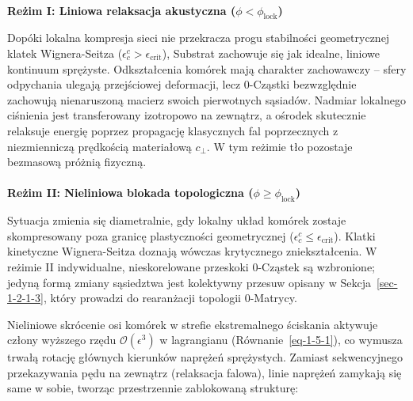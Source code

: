 \documentclass[
  polish,
  letterpaper,
  DIV=11,
  numbers=noendperiod,
  oneside]{scrartcl}
\makeatletter
\let\oldparagraph\paragraph
\renewcommand{\paragraph}{
    \@ifstar
      \xxxParagraphStar
      \xxxParagraphNoStar
  }
\newcommand{\xxxParagraphStar}[1]{\oldparagraph*{#1}\mbox{}}
\newcommand{\xxxParagraphNoStar}[1]{\oldparagraph{#1}\mbox{}}
\makeatother
\begin{document}
\paragraph{\texorpdfstring{\textbf{Reżim I: Liniowa relaksacja
akustyczna
(\(\phi < \phi_{\text{lock}}\))}}{Reżim I: Liniowa relaksacja akustyczna (\textbackslash phi \textless{} \textbackslash phi\_\{\textbackslash text\{lock\}\})}}\label{sec-1-5-2-1}

Dopóki lokalna kompresja sieci nie przekracza progu stabilności
geometrycznej klatek Wignera-Seitza
(\(\epsilon^c_c > \epsilon_{\text{crit}}\)), Substrat zachowuje się jak
idealne, liniowe kontinuum sprężyste. Odkształcenia komórek mają
charakter zachowawczy -- sfery odpychania ulegają przejściowej
deformacji, lecz 0-Cząstki bezwzględnie zachowują nienaruszoną macierz
swoich pierwotnych sąsiadów. Nadmiar lokalnego ciśnienia jest
transferowany izotropowo na zewnątrz, a ośrodek skutecznie relaksuje
energię poprzez propagację klasycznych fal poprzecznych z niezmienniczą
prędkością materiałową \(c_{\perp}\). W tym reżimie tło pozostaje
bezmasową próżnią fizyczną.

\paragraph{\texorpdfstring{\textbf{Reżim II: Nieliniowa blokada
topologiczna
(\(\phi \ge \phi_{\text{lock}}\))}}{Reżim II: Nieliniowa blokada topologiczna (\textbackslash phi \textbackslash ge \textbackslash phi\_\{\textbackslash text\{lock\}\})}}\label{sec-1-5-2-2}

Sytuacja zmienia się diametralnie, gdy lokalny układ komórek zostaje
skompresowany poza granicę plastyczności geometrycznej
(\(\epsilon^c_c \le \epsilon_{\text{crit}}\)). Klatki kinetyczne
Wignera-Seitza doznają wówczas krytycznego zniekształcenia. W reżimie II
indywidualne, nieskorelowane przeskoki 0-Cząstek są wzbronione; jedyną
formą zmiany sąsiedztwa jest kolektywny przesuw opisany w
Sekcja~\ref{sec-1-2-1-3}, który prowadzi do rearanżacji topologii
0-Matrycy.

Nieliniowe skrócenie osi komórek w strefie ekstremalnego ściskania
aktywuje człony wyższego rzędu \(\mathcal{O}(\epsilon^3)\) w lagrangianu
(Równanie~\ref{eq-1-5-1}), co wymusza trwałą rotację głównych kierunków
naprężeń sprężystych. Zamiast sekwencyjnego przekazywania pędu na
zewnątrz (relaksacja falowa), linie naprężeń zamykają się same w sobie,
tworząc przestrzennie zablokowaną strukturę:
\end{document}
